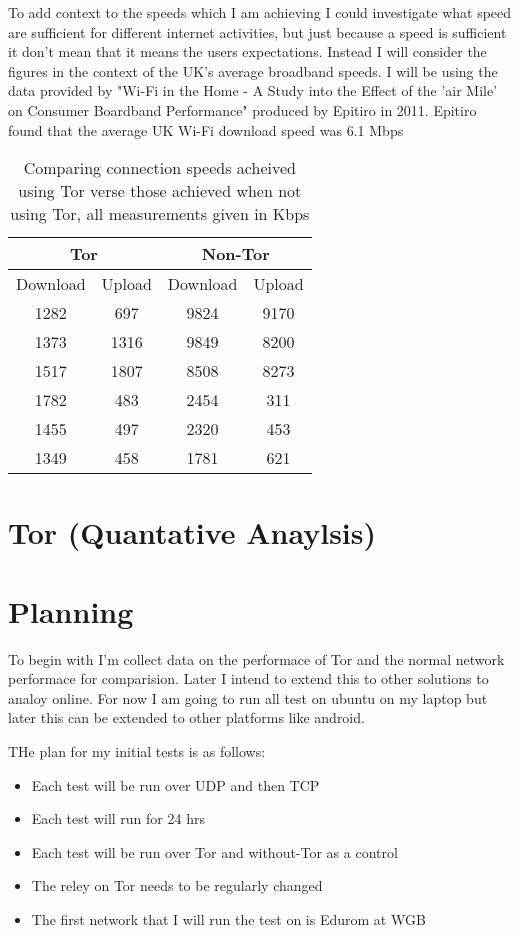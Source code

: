 \documentclass[12pt,a4paper,oneside]{article}
\begin{document}
{To add context to the speeds which I am achieving I could investigate what speed are sufficient for different internet activities, but just because a speed is sufficient it don't mean that it means the users expectations. Instead I will consider the figures in the context of the UK's average broadband speeds. I will be using the data provided by "Wi-Fi in the Home - A Study into the Effect of the 'air Mile' on Consumer Boardband Performance" produced by Epitiro in 2011. Epitiro found that the average UK Wi-Fi download speed was 6.1 Mbps


\begin{table}[tbp]
\centering
\begin{tabular}{|c c|c c|}
	\hline
	\multicolumn{2}{|c|}{Tor} & \multicolumn{2}{|c|}{Non-Tor} \\
	\hline
	Download & Upload & Download & Upload \\
	\hline
	1282 & 697 & 9824 & 9170 \\
	1373 & 1316 & 9849 & 8200 \\
	1517 & 1807 & 8508 & 8273 \\
	\hline
	1782 & 483 & 2454 & 311 \\
	1455 & 497 & 2320 & 453 \\
	1349 & 458 & 1781 & 621 \\
	\hline
	
	

\end{tabular}
\caption{Comparing connection speeds acheived using Tor verse those achieved when not using Tor, all measurements given in Kbps}
\label{tab:my table on Tor connection speeds}
\end{table}



\section{Tor (Quantative Anaylsis)}

\section{Planning}
To begin with I'm collect data on the performace of Tor and the normal network performace for comparision. Later I intend to extend this to other solutions to analoy online. For now I am going to run all test on ubuntu on my laptop but later this can be extended to other platforms like android. 

THe plan for my initial tests is as follows:
\begin{itemize}
\item Each test will be run over UDP and then TCP
\item Each test will run for 24 hrs 
\item Each test will be run over Tor and without-Tor as a control
\item The reley on Tor needs to be regularly changed
\item The first network that I will run the test on is Edurom at WGB


\end{itemize}}
\end{document}
